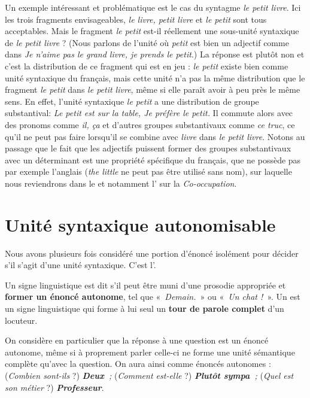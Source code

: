 Un exemple intéressant et problématique est le cas du syntagme \textit{le petit livre}. Ici les trois fragments envisageables, \textit{le livre, petit livre} et \textit{le petit} sont tous acceptables. Mais le fragment \textit{le petit} est-il réellement une sous-unité syntaxique de \textit{le petit livre} ? (Nous parlons de l’unité où \textit{petit} est bien un adjectif comme dans \textit{Je n’aime pas le grand livre, je prends le petit}.) La réponse est plutôt non et c’est la distribution de ce fragment qui est en jeu : \textit{le petit} existe bien comme unité syntaxique du français, mais cette unité n’a pas la même distribution que le fragment \textit{le petit} dans \textit{le petit livre}, même si elle paraît avoir à peu près le même sens. En effet, l’unité syntaxique \textit{le petit} a une distribution de groupe substantival: \textit{Le petit est sur la table, Je préfère le petit.} Il commute alors avec des pronoms comme \textit{il, ça} et d’autres groupes substantivaux comme \textit{ce truc}, ce qu’il ne peut pas faire lorsqu’il se combine avec \textit{livre} dans \textit{le petit livre}. Notons au passage que le fait que les adjectifs puissent former des groupes substantivaux avec un déterminant est une propriété spécifique du français, que ne possède pas par exemple l’anglais (\textit{the little} ne peut pas être utilisé sans nom), sur laquelle nous reviendrons dans le  et notamment l’ sur la \textit{Co-occupation}.

\section{Unité syntaxique autonomisable}\label{sec:3.2.11}

Nous avons plusieurs fois considéré une portion d’énoncé isolément pour décider s’il s’agit d’une unité syntaxique. C’est l’.

{Un signe linguistique est dit  s’il peut être muni d’une prosodie appropriée et \textbf{former un énoncé autonome}, tel que «~\textit{Demain.~}» ou «~\textit{Un chat !~}». Un  est un signe linguistique qui forme à lui seul un \textbf{tour de parole complet} d’un locuteur.}

On considère en particulier que la réponse à une question est un énoncé autonome, même si à proprement parler celle-ci ne forme une unité sémantique complète qu’avec la question. On aura ainsi comme énoncés autonomes : (\textit{Combien sont-ils} ?) \textbf{\textit{Deux~}}\textit{;} (\textit{Comment est-elle} ?) \textbf{\textit{Plutôt sympa~}}\textit{;} (\textit{Quel est son métier} ?) \textbf{\textit{Professeur}}.

